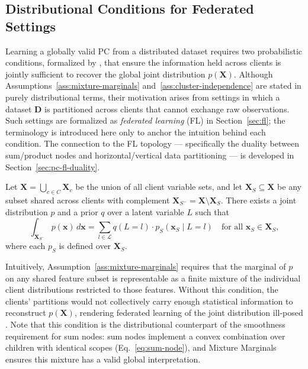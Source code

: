 \subsection*{Distributional Conditions for Federated Settings}\label{sec:pc-federated-conditions}

Learning a globally valid PC from a distributed dataset requires two probabilistic conditions, formalized by \cite{Seng2025ScalingPC}, that ensure
the information held across clients is jointly sufficient to recover the global joint distribution $p(\mathbf{X})$.
Although Assumptions~\ref{ass:mixture-marginals} and~\ref{ass:cluster-independence} are stated in purely distributional terms, their motivation arises from settings in which a dataset $\mathbf{D}$ is partitioned across clients that cannot exchange raw observations.
Such settings are formalized as \emph{federated learning} (FL) in
Section~\ref{sec:fl}; the terminology is introduced here only to anchor the intuition behind each condition.
The connection to the FL topology --- specifically the duality between sum/product nodes and horizontal/vertical data partitioning --- is developed in Section~\ref{sec:pc-fl-duality}.

\begin{assumption}%
\label{ass:mixture-marginals}
Let $\mathbf{X} = \bigcup_{c \in C} \mathbf{X}_c$ be the union of all client variable sets, and let $\mathbf{X}_S \subseteq \mathbf{X}$ be any subset shared across clients with complement $\mathbf{X}_{S^-} = \mathbf{X} \setminus \mathbf{X}_S$.
There exists a joint distribution $p$ and a prior $q$ over a latent variable $L$ such that
\[
  \int_{\mathbf{X}_{S^-}} p(\mathbf{x})\,d\mathbf{x}
  = \sum_{l \in \mathcal{L}} q(L = l)\cdot p_S(\mathbf{x}_S \mid L = l)
  \quad \text{for all } \mathbf{x}_S \in \mathbf{X}_S,
\]
where each $p_S$ is defined over $\mathbf{X}_S$.
\end{assumption}

Intuitively, Assumption~\ref{ass:mixture-marginals} requires that the marginal of $p$ on any shared feature subset is representable as a finite mixture of the individual client distributions restricted to those features.
Without this condition, the clients' partitions would not collectively carry enough statistical information to reconstruct $p(\mathbf{X})$, rendering federated learning of the joint distribution ill-posed \cite{Seng2025ScalingPC}.
Note that this condition is the distributional counterpart of the smoothness requirement for sum nodes: sum nodes implement a convex combination over children with identical scopes (Eq.~\eqref{eq:sum-node}), and Mixture Marginals ensures this mixture has a valid global interpretation.


